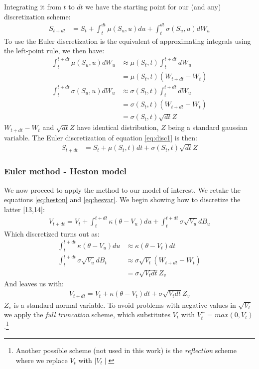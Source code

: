 \documentclass[12pt,twoside]{reedthesis}
\theoremstyle{definition}
\theoremstyle{definition}
\theoremstyle{remark}
\begin{document}
  Integrating it from \(t\) to \(dt\) we have the starting point for our
  (and any) discretization scheme:
  \begin{align}
  \label{eq:disc1}
  S_{t+dt} &= S_t + \int_{t}^{dt}{\mu(S_u,u)}du + \int_{t}^{dt}{\sigma(S_u,u)} dW_u
  \end{align}
  To use the Euler discretization is the equivalent of approximating
  integrals using the left-point rule, we then have:
  \begin{align*}
   \int_{t}^{t+dt}{\mu(S_u,u)} dW_u &\approx \mu(S_t,t) \int_{t}^{t+dt}dW_u\\
  &= \mu(S_t,t) (W_{t+dt} - W_t)  \\
   \int_{t}^{t+dt}{\sigma(S_u,u)} dW_u &\approx \sigma(S_t,t) \int_{t}^{t+dt}dW_u\\
  &= \sigma(S_t,t) (W_{t+dt} - W_t)  \\
  &= \sigma(S_t,t) \sqrt{dt} Z
  \end{align*}
  \(W_{t+dt}-W_t\) and \(\sqrt{dt}Z\) have identical distribution, \(Z\)
  being a standard gaussian variable. The Euler discretization of equation
  \eqref{eq:disc1} is then:
  \begin{align}
  \label{eq:disc2}
  S_{t+dt} &= S_t + \mu(S_t,t)dt + \sigma(S_t,t)\sqrt{dt}Z
  \end{align}
  \subsubsection{Euler method - Heston
  model}\label{euler-method---heston-model}
  
  We now proceed to apply the method to our model of interest. We retake
  the equations \eqref{eq:heston} and \eqref{eq:hesvar}. We begin showing how
  to discretize the latter {[}13,14{]}:
  \begin{align}
  \label{eq:hesvareuler}
  V_{t+dt} = V_t+ \int_{t}^{t+dt}{\kappa (\theta - V_u) du} + \int_{t}^{t+dt}{\sigma \sqrt{V_u} dB_u}
  \end{align}
  Which discretized turns out as:
  \begin{align*}
   \int_{t}^{t+dt}{\kappa (\theta - V_u)} du &\approx \kappa (\theta - V_t) dt\\
   \int_{t}^{t+dt}{\sigma \sqrt{V_u}} dB_t &\approx \sigma \sqrt{V_t} (W_{t+dt}-W_t)\\
  &= \sigma \sqrt{V_t dt} Z_v
  \end{align*}
  And leaves us with:
  \begin{align}
  V_{t+dt} = V_t + \kappa (\theta - V_t) dt + \sigma \sqrt{V_t dt} Z_v
  \end{align}
  \(Z_v\) is a standard normal variable. To avoid problems with negative
  values in \(\sqrt{V_t}\) we apply the \emph{full truncation} scheme,
  which substitutes \(V_t\) with \(V_t^+ = max(0, V_t)\).\footnote{Another
    possible scheme (not used in this work) is the \emph{reflection}
    scheme where we replace \(V_t\) with \(\mid V_t \mid\)}
  
\end{document}
